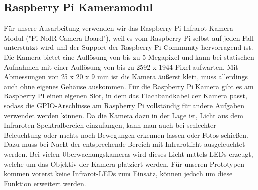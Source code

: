 \documentclass[journal]{IEEEtran}
\begin{document}
\subsection{Raspberry Pi Kameramodul}
Für unsere Ausarbeitung verwenden wir das Raspberry Pi Infrarot Kamera Modul ("Pi NoIR Camera Board"), weil es vom Raspberry Pi selbst auf jeden Fall unterstützt wird und der Support der Raspberry Pi Community hervorragend ist. Die Kamera bietet eine Auflösung von bis zu 5 Megapixel und kann bei statischen Aufnahmen mit einer Auflösung von bis zu 2592 x 1944 Pixel aufwarten. Mit Abmessungen von 25 x 20 x 9 mm ist die Kamera äußerst klein, muss allerdings auch ohne eigenes Gehäuse auskommen. Für die Raspberry Pi Kamera gibt es am Raspberry Pi einen eigenen Slot, in dem das Flachbandkabel der Kamera passt, sodass die GPIO-Anschlüsse am Raspberry Pi vollständig für andere Aufgaben verwendet werden können. Da die Kamera dazu in der Lage ist, Licht aus dem Infraroten Spektralbereich einzufangen, kann man auch bei schlechter Beleuchtung oder nachts noch Bewegungen erkennen lassen oder Fotos schießen. Dazu muss bei Nacht der entsprechende Bereich mit Infrarotlicht ausgeleuchtet werden. Bei vielen Überwachungskameras wird dieses Licht mittels LEDs erzeugt, welche um das Objektiv der Kamera platziert werden. Für unseren Prototypen kommen vorerst keine Infrarot-LEDs zum Einsatz, können jedoch um diese Funktion erweitert werden. 
\end{document}
